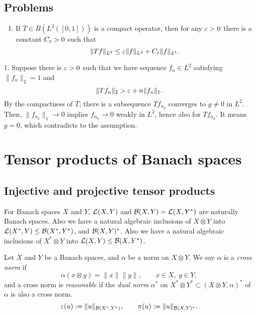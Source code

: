 \documentclass{../../large}
\begin{document}
\section*{Problems}
\begin{enumerate}
\item If $T\in B(L^2([0,1]))$ is a compact operator, then for any $\varepsilon>0$ there is a constant $C_\varepsilon>0$ such that
\[\|Tf\|_{L^2}\le\varepsilon\|f\|_{L^2}+C_\varepsilon\|f\|_{L^1}.\]
\end{enumerate}

\begin{pf}
1. Suppose there is $\varepsilon>0$ such that we have sequence $f_n\in L^2$ satisfying $\|f_n\|_2=1$ and
\[\|Tf_n\|_2>\varepsilon+n\|f_n\|_1.\]
By the compactness of $T$, there is a subsequence $Tf_{n_k}$ converges to $g\ne0$ in $L^2$.
Then, $\|f_{n_k}\|_1\to0$ implies $f_{n_k}\to0$ weakly in $L^2$, hence also for $Tf_{n_k}$.
It means $g=0$, which contradicts to the assumption.
\end{pf}




\chapter{Tensor products of Banach spaces}

\section{Injective and projective tensor products}

\begin{prb}[Realizations]
For Banach spaces $X$ and $Y$, $\mathcal{L}(X,Y)$ and $\mathcal{B}(X,Y)=\mathcal{L}(X,Y^*)$ are naturally Banach spaces.
Also we have a natural algebraic inclusions of $X\otimes Y$ into $\mathcal{L}(X^*,Y)\le\mathcal{B}(X^*,Y^*)$, and $\mathcal{B}(X,Y)^*$.
Also we have a natural algebraic inclusions of $X^*\otimes Y$ into $\mathcal{L}(X,Y)\le\mathcal{B}(X,Y^*)$.
\end{prb}

\begin{prb}
Let $X$ and $Y$ be a Banach spaces, and $\alpha$ be a norm on $X\otimes Y$.
We say $\alpha$ is a \emph{cross norm} if
\[\alpha(x\otimes y)=\|x\|\|y\|,\qquad x\in X,\ y\in Y,\]
and a cross norm is \emph{reasonable} if the \emph{dual norm} $\alpha^*$ on $X^*\otimes Y^*\subset(X\otimes Y,\alpha)^*$ of $\alpha$ is also a cross norm.
\[\varepsilon(u):=\|u\|_{\mathcal{B}(X^*,Y^*)},\qquad\pi(u):=\|u\|_{\mathcal{B}(X,Y)^*}.\]
\end{prb}

\begin{prb}
\end{prb}
\end{document}
